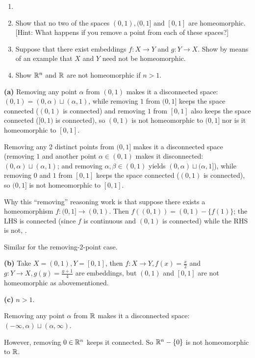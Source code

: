 \documentclass[a4paper, 12pt]{article}
\begin{document}
\begin{problem} 
    \begin{enumerate}
    \item[] 
    \item Show that no two of the spaces $(0, 1), (0, 1]$ and $[0, 1]$ are homeomorphic. [Hint: What happens if you remove a point from each of these spaces?]
    \item Suppose that there exist embeddings $f: X \to Y$ and $g: Y \to X$. Show by means of an example that $X$ and $Y$ need not be homeomorphic.
    \item Show $\mathbb{R}^n$ and $\mathbb{R}$ are not homeomorphic if $n > 1$.
\end{enumerate}
\end{problem}
\begin{solution}
\textbf{(a)} Removing any point $\alpha$ from $(0, 1)$ makes it a disconnected space: $(0, 1) = (0, \alpha) \sqcup (\alpha, 1)$, while removing $1$ from $(0, 1]$ keeps the space connected ($(0, 1)$ is connected) and removing $1$ from $[0, 1]$ also keeps the space connected ($[0, 1)$ is connected), so $(0, 1)$ is not homeomorphic to $(0, 1]$ nor is it homeomorphic to $[0, 1]$.

Removing any 2 distinct points from $(0, 1]$ makes it a disconnected space (removing $1$ and another point $\alpha \in (0, 1)$ makes it disconnected: $(0, \alpha) \sqcup (\alpha, 1)$; and removing $\alpha, \beta \in (0, 1)$ yields $(0, \alpha) \sqcup (\alpha, 1]$), while removing $0$ and $1$ from $[0, 1]$ keeps the space connected ($(0, 1)$ is connected), so $(0, 1]$ is not homeomorphic to $[0, 1]$.

Why this ``removing'' reasoning work is that suppose there exists a homeomorphism $f: (0, 1] \to (0, 1)$. Then $f((0, 1)) = (0, 1) - \{f(1)\}$; the LHS is connected (since $f$ is continuous and $(0, 1)$ is connected) while the RHS is not, \contra.

Similar for the removing-2-point case.

\textbf{(b)} Take $X = (0, 1), Y = [0, 1]$, then $f: X \to Y, f(x) = \frac{x}{2}$ and $g: Y \to X, g(y) = \frac{y+1}{4}$ are embeddings, but $(0, 1)$ and $[0, 1]$ are not homeomorphic as abovementioned.

\textbf{(c)} $n > 1$. 

Removing any point $\alpha$ from $\mathbb{R}$ makes it a disconnected space: $(- \infty, \alpha) \sqcup (\alpha, \infty)$.

However, removing $0 \in \mathbb{R}^n$ keeps it connected. So $\mathbb{R}^n - \{0\}$ is not homeomorphic to $\mathbb{R}$.
\end{solution}
\end{document}
